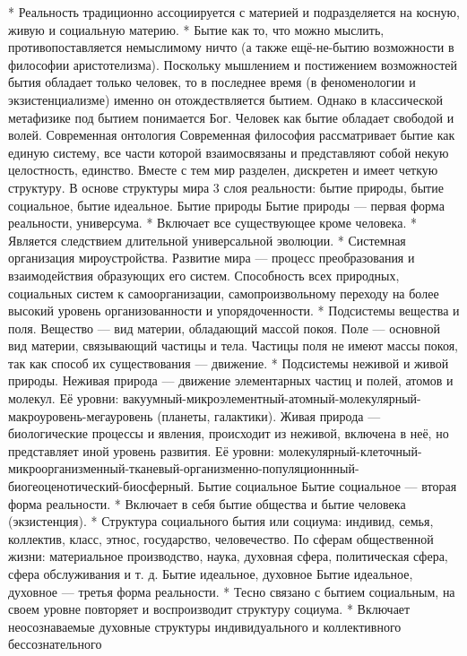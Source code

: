 \documentclass[12pt]{article}
\begin{document}
   * Реальность традиционно ассоциируется с материей и подразделяется на косную, живую и социальную
материю.
   * Бытие как то, что можно мыслить, противопоставляется немыслимому ничто (а также ещё-не-бытию
возможности  в  философии  аристотелизма).  Поскольку  мышлением  и  постижением  возможностей  бытия
обладает  только  человек,  то  в  последнее  время  (в  феноменологии  и  экзистенциализме)  именно  он
отождествляется бытием. Однако в классической метафизике под бытием понимается Бог. Человек как бытие
обладает свободой и волей.
Современная онтология
Современная  философия  рассматривает  бытие  как  единую  систему,  все  части  которой  взаимосвязаны  и
представляют собой некую целостность, единство. Вместе с тем мир разделен, дискретен и имеет четкую
структуру. В основе структуры мира 3 слоя реальности: бытие природы, бытие социальное, бытие идеальное.
Бытие природы
Бытие природы — первая форма реальности, универсума.
* Включает все существующее кроме человека.
* Является следствием длительной универсальной эволюции.
   * Системная организация мироустройства. Развитие мира — процесс преобразования и взаимодействия
образующих  его  систем.  Способность  всех  природных,  социальных  систем  к  самоорганизации,
самопроизвольному переходу на более высокий уровень организованности и упорядоченности.
* Подсистемы вещества и поля. Вещество — вид материи, обладающий массой покоя. Поле — основной вид
материи, связывающий частицы и тела. Частицы поля не имеют массы покоя, так как способ их существования
— движение.
   * Подсистемы неживой и живой природы. Неживая природа — движение элементарных частиц и полей,
атомов и молекул. Её уровни: вакуумный-микроэлементный-атомный-молекулярный-макроуровень-мегауровень
(планеты, галактики). Живая природа — биологические процессы и явления, происходит из неживой, включена
в неё, но представляет иной уровень развития. Её уровни: молекулярный-клеточный-микроорганизменный-тканевый-организменно-популяционнный-биогеоценотический-биосферный.
Бытие социальное
Бытие социальное — вторая форма реальности.
* Включает в себя бытие общества и бытие человека (экзистенция).
    *  Структура  социального  бытия  или  социума:  индивид,  семья,  коллектив,  класс,  этнос,  государство,
человечество.  По  сферам  общественной  жизни:  материальное  производство,  наука,  духовная  сфера,
политическая сфера, сфера обслуживания и т. д.
Бытие идеальное, духовное
Бытие идеальное, духовное — третья форма реальности.
* Тесно связано с бытием социальным, на своем уровне повторяет и воспроизводит структуру социума.
    *  Включает  неосознаваемые  духовные  структуры  индивидуального  и  коллективного  бессознательного
\end{document}
